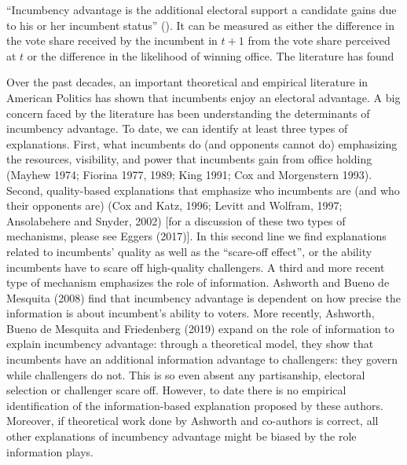 \documentclass[12pt]{amsart}
\makeatletter
\def\section{\@startsection{section}{1}
	\z@{1.0\linespacing\@plus\linespacing}{.5\linespacing}{\Large}}
\numberwithin{equation}{section}
\theoremstyle{definition}
\theoremstyle{definition}
\theoremstyle{definition}
\makeatother
\begin{document}
\clearpage


\section{Incumbency advantage}
``Incumbency advantage is the additional electoral support a candidate gains due to his or her incumbent status'' (\citet{cox_morgensten_1993, p. 329}). It can be measured as either the difference in the vote share received by the incumbent in $t+1$ from the vote share perceived at $t$ or the difference in the likelihood of winning office. The literature has found 

Over the past decades, an important theoretical and empirical literature in American Politics has shown that incumbents enjoy an electoral advantage. A big concern faced by the literature has been understanding the determinants of incumbency advantage. To date, we can identify at least three types of explanations.  First, what incumbents do (and opponents cannot do) emphasizing the resources, visibility, and power that incumbents gain from office holding (Mayhew 1974; Fiorina 1977, 1989; King 1991; Cox and Morgenstern 1993). Second, quality-based explanations that emphasize who incumbents are (and who their opponents are) (Cox and Katz, 1996; Levitt and Wolfram, 1997; Ansolabehere and Snyder, 2002) [for a discussion of these two types of mechanisms, please see Eggers (2017)]. In this second line we find explanations related to incumbents’ quality as well as the “scare-off effect”, or the ability incumbents have to scare off high-quality challengers. A third and more recent type of mechanism emphasizes the role of information. Ashworth and Bueno de Mesquita (2008) find that incumbency advantage is dependent on how precise the information is about incumbent’s ability to voters. More recently, Ashworth, Bueno de Mesquita and Friedenberg (2019) expand on the role of information to explain incumbency advantage: through a theoretical model, they show that incumbents have an additional information advantage to challengers: they govern while challengers do not. This is so even absent any partisanship, electoral selection or challenger scare off. However, to date there is no empirical identification of the information-based explanation proposed by these authors. Moreover, if theoretical work done by Ashworth and co-authors is correct, all other explanations of incumbency advantage might be biased by the role information plays. 
\end{document}
